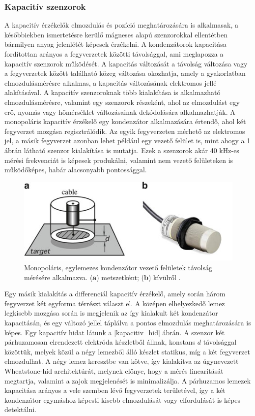 \subsubsection{Kapacitív szenzorok}

A kapacitív érzékelők elmozdulás és pozíció meghatározására is alkalmasak, a későbbiekben ismertetésre kerülő mágneses alapú szenzorokkal ellentétben bármilyen anyag jelenlétét képesek érzékelni.
A kondenzátorok kapacitása fordítottan arányos a fegyverzetek közötti távolsággal, ami meglapozza a kapacitív szenzorok működését. A kapacitás változását a távolság változása vagy a fegyverzetek között található közeg változása okozhatja, amely a gyakorlatban elmozdulásmérésre alkalmas, a kapacitás változásának elektromos jellé alakításával.
A kapacitív szenzoroknak több kialakítása is alkalmazható elmozdulásmérésre, valamint egy szenzorok részeként, ahol az elmozdulást egy erő, nyomás vagy hőmérséklet változásainak dekódolására alkalmazhatják.
A monopoláris kapacitív érzékelő egy kondenzátor alkalmazására értendő, ahol két fegyverzet mozgása regisztrálódik. Az egyik fegyverzeten mérhető az elektromos jel, a másik fegyverzet azonban lehet például egy vezető felület is, mint ahogy a \ref{kapacitiv_kabel} ábrán látható szenzor kialakítása is mutatja. Ezek a szenzorok akár 40 kHz-es mérési frekvenciát is képesek produkálni, valamint nem vezető felületeken is működőképes, habár alacsonyabb pontossággal.
\begin{figure}
	\centering
	\includegraphics{figures/kapacitiv_szenzor_kabeles.png}
	\caption{Monopoláris, egylemezes kondenzátor vezető felületek távolság mérésére alkalmazva. (\textbf{a}) metszetként; (\textbf{b}) kívülről \cite{Fraden2016a}.}
	\label{kapacitiv_kabel}
\end{figure}
Egy másik kialakítás a differenciál kapacitív érzékelő, amely során három fegyverzet két egyforma térrészt választ el. A középen elhelyezkedő lemez legkisebb mozgása során is megjelenik az így kialakult két kondenzátor kapacitásán, és egy változó jellel táplálva a pontos elmozdulás meghatározására is képes.
Egy kapacitív hidat látunk a \ref{kapacitiv_hid} ábrán. A szenzor két párhuzamosan elrendezett elektróda készletből állnak, konstans $d$ távolsággal közöttük, melyek közül a négy lemezből álló készlet statikus, míg a két fegyverzet elmozdulhat. A négy lemez keresztbe van kötve, így kialakítva az úgynevezett Wheatstone-híd architektúrát, melynek előnye, hogy a mérés linearitását megtartja, valamint a zajok megjelenését is minimalizálja. A párhuzamos lemezek kapacitása arányos a vele szemben lévő fegyverzetek területével, így a két kondenzátor egymáshoz képesti kisebb elmozdulását vagy elfordulását is képes detektálni. 
